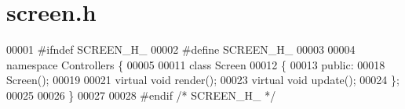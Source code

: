 \section{screen.\+h}
\label{screen_8h_source}

\begin{DoxyCode}
00001 \textcolor{preprocessor}{#ifndef SCREEN\_H\_}
00002 \textcolor{preprocessor}{#define SCREEN\_H\_}
00003 
00004 \textcolor{keyword}{namespace }Controllers \{
00005     
00011     \textcolor{keyword}{class }Screen
00012     \{
00013     \textcolor{keyword}{public}:
00018         Screen();
00019 
00021         \textcolor{keyword}{virtual} \textcolor{keywordtype}{void} render();
00023         \textcolor{keyword}{virtual} \textcolor{keywordtype}{void} update();
00024     \};
00025 
00026 \}
00027 
00028 \textcolor{preprocessor}{#endif }\textcolor{comment}{/* SCREEN\_H\_ */}\textcolor{preprocessor}{}
\end{DoxyCode}
